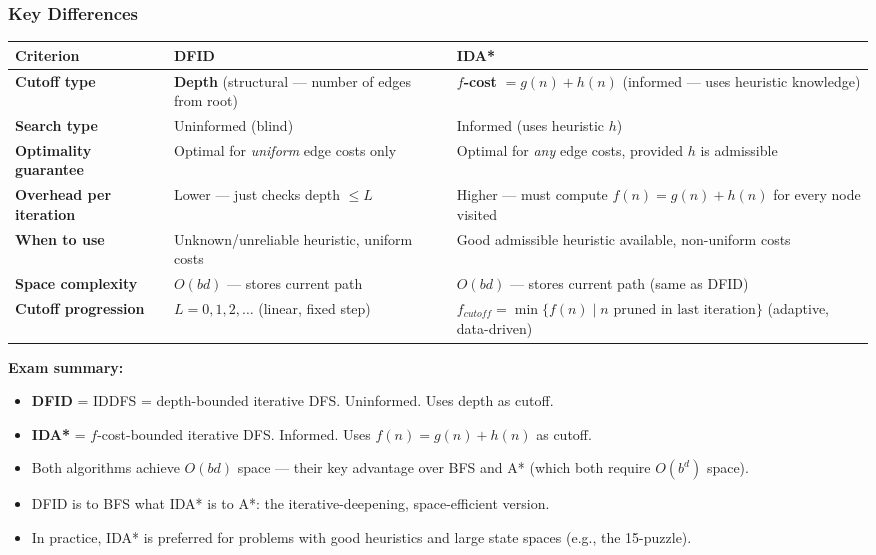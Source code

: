 \documentclass[12pt, a4paper]{article}
\newenvironment{notesbox}{\begin{mdframed}[style=notesframe]}{\end{mdframed}}
\begin{document}
\subsubsection*{Key Differences}

\begin{center}
\renewcommand{\arraystretch}{1.4}
\begin{tabular}{l|p{6.5cm}|p{6.5cm}}
\toprule
\textbf{Criterion} & \textbf{DFID} & \textbf{IDA*} \\
\midrule
\textbf{Cutoff type} & \textbf{Depth} (structural — number of edges from root) & \textbf{$f$-cost} $= g(n)+h(n)$ (informed — uses heuristic knowledge) \\
\midrule
\textbf{Search type} & Uninformed (blind) & Informed (uses heuristic $h$) \\
\midrule
\textbf{Optimality guarantee} & Optimal for \emph{uniform} edge costs only & Optimal for \emph{any} edge costs, provided $h$ is admissible \\
\midrule
\textbf{Overhead per iteration} & Lower — just checks depth $\leq L$ & Higher — must compute $f(n)=g(n)+h(n)$ for every node visited \\
\midrule
\textbf{When to use} & Unknown/unreliable heuristic, uniform costs & Good admissible heuristic available, non-uniform costs \\
\midrule
\textbf{Space complexity} & $O(bd)$ — stores current path & $O(bd)$ — stores current path (same as DFID) \\
\midrule
\textbf{Cutoff progression} & $L = 0, 1, 2, \ldots$ (linear, fixed step) & $f_\textit{cutoff} = \min\{f(n) \mid n \text{ pruned in last iteration}\}$ (adaptive, data-driven) \\
\bottomrule
\end{tabular}
\end{center}

\begin{notesbox}
\textbf{Exam summary:}
\begin{itemize}[noitemsep,topsep=2pt]
  \item \textbf{DFID} = IDDFS = depth-bounded iterative DFS. Uninformed. Uses depth as cutoff.
  \item \textbf{IDA*} = $f$-cost-bounded iterative DFS. Informed. Uses $f(n)=g(n)+h(n)$ as cutoff.
  \item Both algorithms achieve $O(bd)$ space — their key advantage over BFS and A* (which both require $O(b^d)$ space).
  \item DFID is to BFS what IDA* is to A*: the iterative-deepening, space-efficient version.
  \item In practice, IDA* is preferred for problems with good heuristics and large state spaces (e.g., the 15-puzzle).
\end{itemize}
\end{notesbox}
\end{document}
